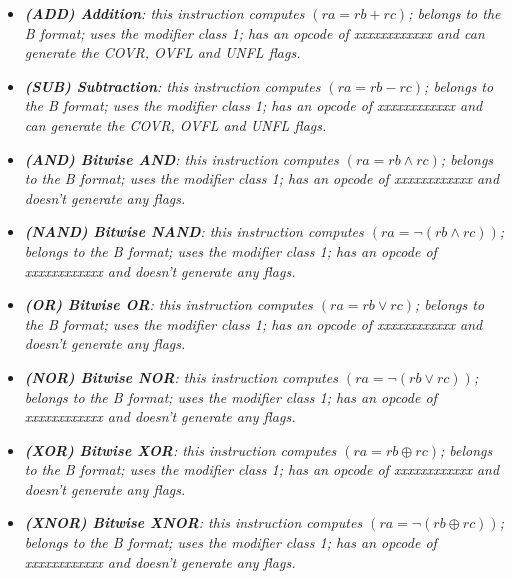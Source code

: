         \begin{multicols}{2}

            \begin{itemize}

                \item \textit{\textbf{(ADD) Addition}: this instruction computes \((ra = rb + rc)\); belongs to the B format; uses the modifier class 1; has an opcode of xxxxxxxxxxxx and can generate the COVR, OVFL and UNFL flags.}

                \item \textit{\textbf{(SUB) Subtraction}: this instruction computes \((ra = rb - rc)\); belongs to the B format; uses the modifier class 1; has an opcode of xxxxxxxxxxxx and can generate the COVR, OVFL and UNFL flags.}

                \item \textit{\textbf{(AND) Bitwise AND}: this instruction computes \((ra = rb \wedge rc)\); belongs to the B format; uses the modifier class 1; has an opcode of xxxxxxxxxxxx and doesn't generate any flags.}

                \item \textit{\textbf{(NAND) Bitwise NAND}: this instruction computes \((ra = \neg(rb \wedge rc))\); belongs to the B format; uses the modifier class 1; has an opcode of xxxxxxxxxxxx and doesn't generate any flags.}

                \item \textit{\textbf{(OR) Bitwise OR}: this instruction computes \((ra = rb \vee rc)\); belongs to the B format; uses the modifier class 1; has an opcode of xxxxxxxxxxxx and doesn't generate any flags.}

                \item \textit{\textbf{(NOR) Bitwise NOR}: this instruction computes \((ra = \neg(rb \vee rc))\); belongs to the B format; uses the modifier class 1; has an opcode of xxxxxxxxxxxx and doesn't generate any flags.}

                \item \textit{\textbf{(XOR) Bitwise XOR}: this instruction computes \((ra = rb \oplus rc)\); belongs to the B format; uses the modifier class 1; has an opcode of xxxxxxxxxxxx and doesn't generate any flags.}

                \item \textit{\textbf{(XNOR) Bitwise XNOR}: this instruction computes \((ra = \neg(rb \oplus rc))\); belongs to the B format; uses the modifier class 1; has an opcode of xxxxxxxxxxxx and doesn't generate any flags.}


\end{itemize}
\end{multicols}
